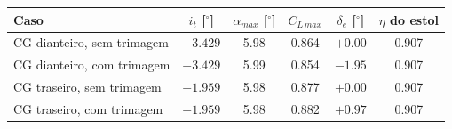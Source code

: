 \begin{tabular}{lccccc}
\toprule
Caso & $i_t$ [$^\circ$] & $\alpha_{max}$ [$^\circ$] & $C_{L\,max}$ & $\delta_e$ [$^\circ$] & $\eta$ do estol \\
\midrule
CG dianteiro, sem trimagem & $-3.429$ & 5.98 & 0.864 & $+0.00$ & 0.907 \\
CG dianteiro, com trimagem & $-3.429$ & 5.99 & 0.854 & $-1.95$ & 0.907 \\
CG traseiro, sem trimagem & $-1.959$ & 5.98 & 0.877 & $+0.00$ & 0.907 \\
CG traseiro, com trimagem & $-1.959$ & 5.98 & 0.882 & $+0.97$ & 0.907 \\
\bottomrule
\end{tabular}
